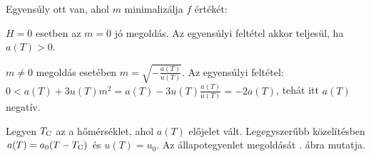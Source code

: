   Egyensúly ott van, ahol $m$ minimalizálja $f$ értékét:
  
  $H=0$ esetben az $m=0$ jó megoldás. Az egyensúlyi feltétel akkor teljesül, ha $a(T)>0$.
  
  $m\ne 0$ megoldás esetében $m=\sqrt{-\frac{a(T)}{u(T)}}$. Az egyensúlyi feltétel: $0<a(T)+3 u(T)m^2=a(T)-3u(T)\frac{a(T)}{u(T)}=-2a(T)$, tehát itt $a(T)$ negatív. 
  
  Legyen $T_\text{C}$ az a hőmérséklet, ahol $a(T)$ előjelet vált. Legegyszerűbb közelítésben $a(T)=a_0(T-T_\text{C})$ és $u(T)=u_0$. Az állapotegyenlet megoldását . ábra mutatja.
  
  \begin{figure}[ht!]
   \centering
    \\
    \hspace{6pt}
    \hspace{6pt}

\end{figure}
